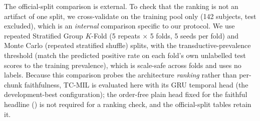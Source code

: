 \documentclass[conference]{IEEEtran}
\begin{document}
The official-split comparison is external. To check
that the ranking is not an artifact of one split, we cross-validate on the
training pool only (142 subjects, test excluded), which is an \emph{internal}
comparison specific to our protocol. We use repeated Stratified Group $K$-Fold
(5 repeats $\times$ 5 folds, 5 seeds per fold) and Monte Carlo (repeated stratified shuffle) splits, with the
transductive-prevalence threshold (match the predicted positive rate on each
fold's own unlabelled test scores to the training prevalence), which is
scale-safe across folds and uses no labels. Because this comparison probes the
architecture \emph{ranking} rather than per-chunk faithfulness, TC-MIL is
evaluated here with its GRU temporal head (the development-best configuration);
the order-free plain head fixed for the faithful headline ()
is not required for a ranking check, and the official-split tables retain it.
\end{document}
